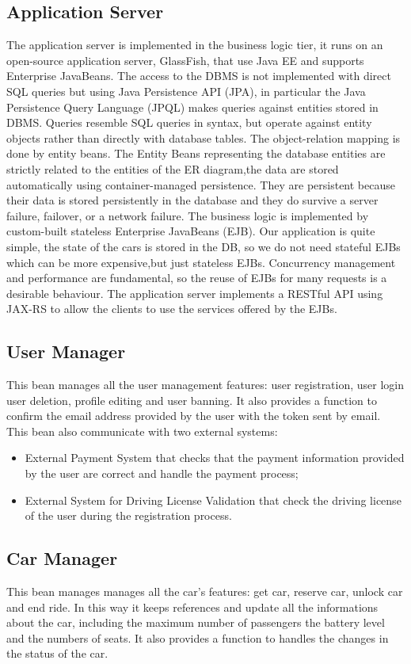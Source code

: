 \subsection{Application Server}
The application server is implemented in the business logic tier, it runs on an open-source application server, GlassFish, that use Java EE and supports Enterprise JavaBeans.
The access to the DBMS is not implemented with direct SQL queries but using Java Persistence API (JPA), in particular the Java Persistence Query Language (JPQL) makes queries against entities stored in DBMS.
Queries resemble SQL queries in syntax, but operate against entity objects rather than directly with database tables.
The object-relation mapping is done by entity beans.
The Entity Beans representing the database entities are strictly related to the entities of the ER diagram,the data  are stored automatically using container-managed persistence.
They are persistent because their data is stored persistently in the database and they do survive a server failure, failover, or a network failure.
The business logic is implemented by custom-built stateless Enterprise JavaBeans (EJB).
Our application is quite simple, the state of the cars is stored in the DB, so we do not need stateful EJBs which can be more expensive,but just stateless EJBs.
Concurrency management and performance are fundamental, so the reuse of EJBs for many requests is a desirable behaviour.
The application server implements a RESTful API using JAX-RS to allow the clients to use the services offered by the EJBs.

\subsection{User Manager}
This bean manages all the user management features: user registration, user login user deletion, profile editing and user banning.
It also provides a function to confirm the email address provided by the user with the token sent by email.
This bean also communicate with two external systems:
\begin{itemize}
\item External Payment System that checks that the payment information provided by the user are correct and handle the payment process;
\item External System for Driving License Validation that check the driving license of the user during the registration process.
\end{itemize}

\subsection{Car Manager}
This bean manages manages all the car's features: get car, reserve car, unlock car and end ride.
In this way it keeps references and update all the informations about the car, including the maximum number of passengers the battery level and the numbers of seats.
It also provides a function to handles the changes in the status of the car.

